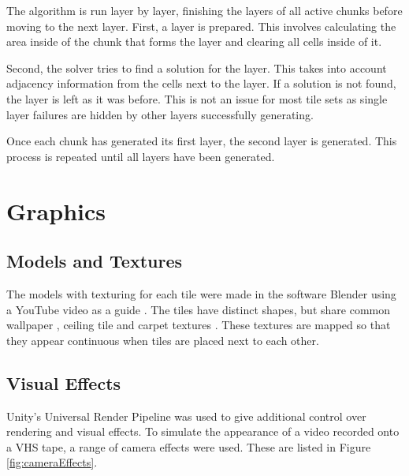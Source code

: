 
The algorithm is run layer by layer, finishing the layers of all active chunks before moving to the next layer. First, a layer is prepared. This involves calculating the area inside of the chunk that forms the layer and clearing all cells inside of it.


Second, the solver tries to find a solution for the layer. This takes into account adjacency information from the cells next to the layer. If a solution is not found, the layer is left as it was before. This is not an issue for most tile sets as single layer failures are hidden by other layers successfully generating.


Once each chunk has generated its first layer, the second layer is generated. This process is repeated until all layers have been generated.


\section{Graphics}
\subsection{Models and Textures}
The models with texturing for each tile were made in the software Blender using a YouTube video as a guide \cite{backroomsGraphics}. The tiles have distinct shapes, but share common wallpaper \cite{sketchfab_texture}, ceiling tile \cite{ceiling_texture} and carpet textures \cite{carpet_texture}. These textures are mapped so that they appear continuous when tiles are placed next to each other.


\subsection{Visual Effects}
Unity's Universal Render Pipeline was used to give additional control over rendering and visual effects. To simulate the appearance of a video recorded onto a VHS tape, a range of camera effects were used. These are listed in Figure \ref{fig:cameraEffects}.

